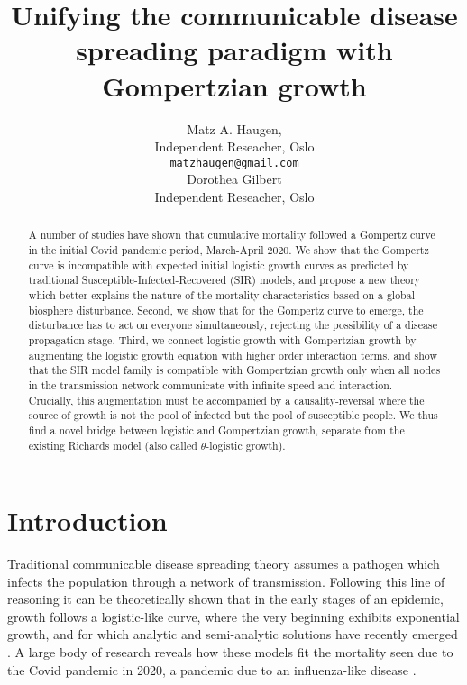 \documentclass{article}
\title{Unifying the communicable disease spreading paradigm with Gompertzian growth}
\author{Matz A. Haugen, \\
Independent Reseacher, Oslo\\
\texttt{matzhaugen@gmail.com} \\
  \And
  Dorothea Gilbert \\
  Independent Reseacher, Oslo\\
}
\begin{document}
\maketitle

\begin{abstract}
A number of studies have shown that cumulative mortality followed a Gompertz curve in the initial Covid pandemic period, March-April 2020. 
We show that the Gompertz curve is incompatible with expected initial logistic growth curves as predicted by traditional Susceptible-Infected-Recovered (SIR) models, and propose a new theory which better explains the nature of the mortality characteristics based on a global biosphere disturbance. 
Second, we show that for the Gompertz curve to emerge, the disturbance has to act on everyone simultaneously, rejecting the possibility of a disease propagation stage. 
Third, we connect logistic growth with Gompertzian growth by augmenting the logistic growth equation with higher order interaction terms, and show that the SIR model family is compatible with Gompertzian growth only when all nodes in the transmission network communicate with infinite speed and interaction. Crucially, this augmentation must be accompanied by a causality-reversal where the source of growth is not the pool of infected but the pool of susceptible people. We thus find a novel bridge between logistic and Gompertzian growth, separate from the existing Richards model (also called $\theta$-logistic growth).
\end{abstract}


\section*{Introduction}
Traditional communicable disease spreading theory assumes a pathogen which infects the population through a network of transmission. 
Following this line of reasoning it can be theoretically shown that in the early stages of an epidemic, growth follows a logistic-like curve, where the very beginning exhibits exponential growth, and for which analytic and semi-analytic solutions have recently emerged \cite{harko2014exact,kroger2020analytical,schlickeiser2021analytical,heng2020approximately}. 
A large body of research reveals how these models fit the mortality seen due to the Covid pandemic in 2020, a pandemic due to an influenza-like disease \cite{carletti2020covid,cooper2020sir,postnikov2020estimation,munoz2021sir,cooper2022dynamical,saikia2021covid}. 
\end{document}
